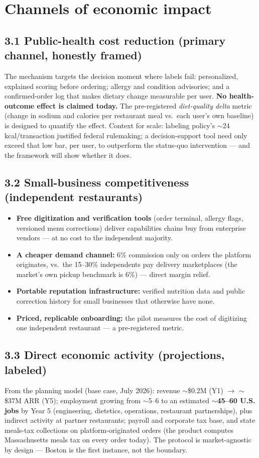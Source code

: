 \documentclass[10pt]{article}
\begin{document}
\section{Channels of economic impact}

\subsection*{3.1 Public-health cost reduction (primary channel, honestly framed)}
The mechanism targets the decision moment where labels fail: personalized, explained scoring before ordering; allergy
and condition advisories; and a confirmed-order log that makes dietary change measurable per user. \textbf{No
health-outcome effect is claimed today.} The pre-registered \emph{diet-quality delta} metric (change in sodium and
calories per restaurant meal vs.\ each user's own baseline) is designed to quantify the effect. Context for scale:
labeling policy's $\sim$24 kcal/transaction justified federal rulemaking; a decision-support tool need only exceed
that low bar, per user, to outperform the status-quo intervention --- and the framework will show whether it does.

\subsection*{3.2 Small-business competitiveness (independent restaurants)}
\begin{itemize}[leftmargin=1.3em,itemsep=2pt]
\item \textbf{Free digitization and verification tools} (order terminal, allergy flags, versioned menu corrections)
deliver capabilities chains buy from enterprise vendors --- at no cost to the independent majority.
\item \textbf{A cheaper demand channel:} 6\% commission only on orders the platform originates, vs.\ the 15--30\%
independents pay delivery marketplaces (the market's own pickup benchmark is 6\%) --- direct margin relief.
\item \textbf{Portable reputation infrastructure:} verified nutrition data and public correction history for small
businesses that otherwise have none.
\item \textbf{Priced, replicable onboarding:} the pilot measures the cost of digitizing one independent restaurant
--- a pre-registered metric.
\end{itemize}

\subsection*{3.3 Direct economic activity (projections, labeled)}
From the planning model (base case, July 2026): revenue $\sim$\$0.2M (Y1) $\to$ $\sim$\$37M ARR (Y5); employment
growing from $\sim$5--6 to an estimated \textbf{$\sim$45--60 U.S. jobs} by Year 5 (engineering, dietetics, operations,
restaurant partnerships), plus indirect activity at partner restaurants; payroll and corporate tax base, and state
meals-tax collections on platform-originated orders (the product computes Massachusetts meals tax on every order
today). The protocol is market-agnostic by design --- Boston is the first instance, not the boundary.
\end{document}
